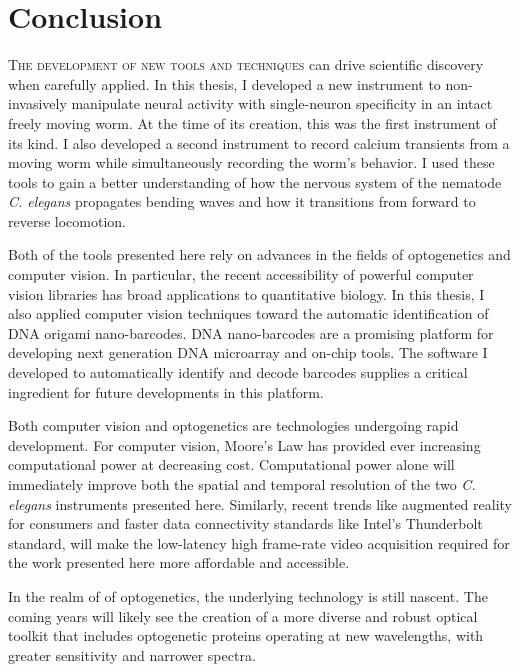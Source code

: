 
\chapter{Conclusion}
\lettrine{T}{he development of new tools and techniques} can drive scientific discovery when carefully applied. In this thesis, I developed a new instrument to non-invasively manipulate neural activity with single-neuron specificity  in an intact freely moving worm. At the time of its creation, this was the first instrument of its kind. I also developed a second instrument to record calcium transients from a moving worm while simultaneously recording the worm's behavior. I used these tools to gain  a better understanding of how the nervous system of the nematode \textit{C. elegans} propagates bending waves and how it transitions from forward to reverse locomotion.

Both of the tools presented here  rely on advances in the fields of optogenetics and computer vision. In particular, the recent accessibility of powerful computer vision libraries  has broad applications to quantitative biology. In this thesis, I also applied computer vision techniques toward the automatic identification of  DNA origami nano-barcodes. DNA nano-barcodes are a promising platform for developing next generation DNA microarray and on-chip tools.  The software I developed to automatically identify and decode barcodes supplies a critical ingredient for future developments in this platform. 

Both  computer vision and optogenetics are technologies undergoing rapid development.
For computer vision, Moore's Law has provided ever increasing computational power at decreasing cost. Computational power alone will immediately improve both the spatial and temporal resolution of the two \textit{C. elegans} instruments presented here. Similarly, recent trends like augmented reality for consumers and faster data connectivity standards like Intel's Thunderbolt standard, will make the low-latency high frame-rate video acquisition  required for the work presented here more affordable and accessible.


In the realm of of optogenetics, the underlying technology is still nascent. The coming years will likely see the creation of a more diverse and robust optical toolkit that includes optogenetic proteins operating at new wavelengths, with greater sensitivity and narrower spectra.  


